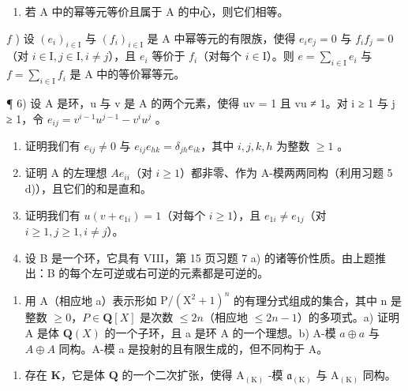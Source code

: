 \begin{enumerate}
\def\labelenumi{\alph{enumi})}
\setcounter{enumi}{4}
\tightlist
\item
  若 A 中的幂等元等价且属于 A 的中心，则它们相等。
\end{enumerate}

\(f\) ) 设 \((e_i)_{i\in \mathrm{I}}\) 与 \((f_{i})_{i\in \mathrm{I}}\) 是 A 中幂等元的有限族，使得 \(e_i e_j = 0\) 与 \(f_{i} f_{j} = 0\)（对 \(i\in \mathrm{I}, j\in \mathrm{I}, i\neq j\)），且 \(e_i\) 等价于 \(f_{i}\)（对每个 \(i\in \mathrm{I}\)）。则 \(e = \sum_{i\in \mathrm{I}}e_i\) 与 \(f = \sum_{i\in \mathrm{I}}f_{i}\) 是 A 中的等价幂等元。

¶ 6) 设 A 是环，u 与 v 是 A 的两个元素，使得 uv = 1 且 vu ≠ 1。对 i ≥ 1 与 j ≥ 1，令 \(e_{ij} = v^{i-1}u^{j-1} - v^i u^j\) 。

\begin{enumerate}
\def\labelenumi{\alph{enumi})}
\item
  证明我们有 \(e_{ij} \neq 0\) 与 \(e_{ij}e_{hk} = \delta_{jh}e_{ik}\)，其中 \(i,j,k,h\) 为整数 \(\geqslant 1\) 。
\item
  证明 A 的左理想 \(Ae_{ii}\)（对 \(i \geqslant 1\)）都非零、作为 A-模两两同构（利用习题 5 d)），且它们的和是直和。
\item
  证明我们有 \(u(v + e_{1i}) = 1\)（对每个 \(i \geqslant 1\)），且 \(e_{1i} \neq e_{1j}\)（对 \(i \geqslant 1, j \geqslant 1, i \neq j\)）。
\item
  设 B 是一个环，它具有 VIII，第 15 页习题 7 a) 的诸等价性质。由上题推出：B 的每个左可逆或右可逆的元素都是可逆的。
\end{enumerate}

\begin{enumerate}
\def\labelenumi{\arabic{enumi})}
\setcounter{enumi}{6}
\tightlist
\item
  用 A（相应地 a）表示形如 \(\mathrm{P}/(\mathrm{X}^{2}+1)^{n}\) 的有理分式组成的集合，其中 n 是整数 \(\geqslant0\)，\(P\in \mathbf{Q}[X]\) 是次数 \(\leqslant2n\)（相应地 \(\leqslant2n-1\)）的多项式。a) 证明 A 是体 \(\mathbf{Q}(X)\) 的一个子环，且 a 是环 A 的一个理想。b) A-模 \(a\oplus a\) 与 \(A\oplus A\) 同构。A-模 a 是投射的且有限生成的，但不同构于 A。
\end{enumerate}

\begin{enumerate}
\def\labelenumi{\alph{enumi})}
\setcounter{enumi}{2}
\tightlist
\item
  存在 \(\mathbf{K}\)，它是体 \(\mathbf{Q}\) 的一个二次扩张，使得 \(\mathrm{A}_{(\mathrm{K})}\) -模 \(\mathfrak{a}_{(\mathrm{K})}\) 与 \(\mathrm{A}_{(\mathrm{K})}\) 同构。
\end{enumerate}

